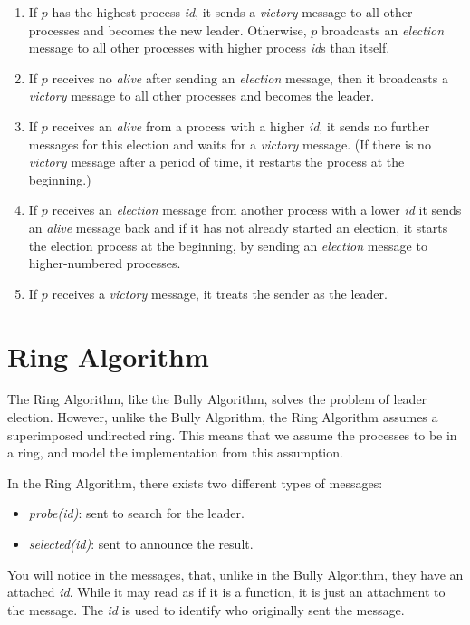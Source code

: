 \documentclass{report}
\begin{document}
\begin{enumerate}
\item If $p$ has the highest process \textit{id}, it sends a \textit{victory} message to all other processes and becomes the new leader. Otherwise, $p$ broadcasts an \textit{election} message to all other processes with higher process \textit{id}s than itself.
\item If $p$ receives no \textit{alive} after sending an \textit{election} message, then it broadcasts a \textit{victory} message to all other processes and becomes the leader.
\item If $p$ receives an \textit{alive} from a process with a higher \textit{id}, it sends no further messages for this election and waits for a \textit{victory} message. (If there is no \textit{victory} message after a period of time, it restarts the process at the beginning.)
\item If $p$ receives an \textit{election} message from another process with a lower \textit{id} it sends an \textit{alive} message back and if it has not already started an election, it starts the election process at the beginning, by sending an \textit{election} message to higher-numbered processes.
\item If $p$ receives a \textit{victory} message, it treats the sender as the leader.
\end{enumerate}

\section{Ring Algorithm}

The Ring Algorithm, like the Bully Algorithm, solves the problem of leader election. However, unlike the Bully Algorithm, the Ring Algorithm assumes a superimposed undirected ring. This means that we assume the processes to be in a ring, and model the implementation from this assumption.

In the Ring Algorithm, there exists two different types of messages:
\begin{itemize}
  \item \textit{probe(id)}: sent to search for the leader.
  \item \textit{selected(id)}: sent to announce the result.
\end{itemize}

You will notice in the messages, that, unlike in the Bully Algorithm, they have an attached \textit{id}. While it may read as if it is a function, it is just an attachment to the message. The \textit{id} is used to identify who originally sent the message.
\end{document}

